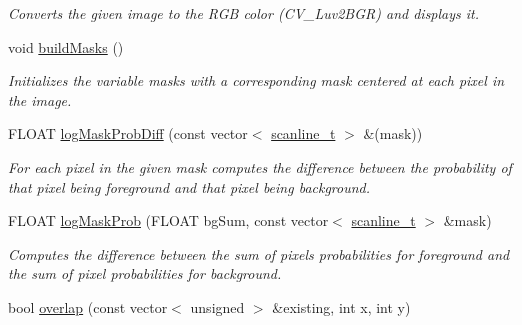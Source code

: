 \begin{DoxyCompactItemize}
\begin{DoxyCompactList}\small\item\em Converts the given image to the RGB color (CV\_\-Luv2BGR) and displays it. \item\end{DoxyCompactList}\item 
\hypertarget{classfindPersonImage_a75c79495f6bea5917afce73830352a4c}{
void \hyperlink{classfindPersonImage_a75c79495f6bea5917afce73830352a4c}{buildMasks} ()}
\label{classfindPersonImage_a75c79495f6bea5917afce73830352a4c}

\begin{DoxyCompactList}\small\item\em Initializes the variable {\ttfamily masks} with a corresponding mask centered at each pixel in the image. \item\end{DoxyCompactList}\item 
\hypertarget{classfindPersonImage_aba30f91bb709a9ed247c80f3a4c827d5}{
FLOAT \hyperlink{classfindPersonImage_aba30f91bb709a9ed247c80f3a4c827d5}{logMaskProbDiff} (const vector$<$ \hyperlink{structscanline__t}{scanline\_\-t} $>$ \&(mask))}
\label{classfindPersonImage_aba30f91bb709a9ed247c80f3a4c827d5}

\begin{DoxyCompactList}\small\item\em For each pixel in the given mask computes the difference between the probability of that pixel being foreground and that pixel being background. \item\end{DoxyCompactList}\item 
\hypertarget{classfindPersonImage_ab92a2618bc71cef02194adb24833c0b3}{
FLOAT \hyperlink{classfindPersonImage_ab92a2618bc71cef02194adb24833c0b3}{logMaskProb} (FLOAT bgSum, const vector$<$ \hyperlink{structscanline__t}{scanline\_\-t} $>$ \&mask)}
\label{classfindPersonImage_ab92a2618bc71cef02194adb24833c0b3}

\begin{DoxyCompactList}\small\item\em Computes the difference between the sum of pixels probabilities for foreground and the sum of pixel probabilities for background. \item\end{DoxyCompactList}\item 
\hypertarget{classfindPersonImage_aaf033810455a87eb5f32cfed75b5519e}{
bool \hyperlink{classfindPersonImage_aaf033810455a87eb5f32cfed75b5519e}{overlap} (const vector$<$ unsigned $>$ \&existing, int x, int y)}
\label{classfindPersonImage_aaf033810455a87eb5f32cfed75b5519e}


\end{DoxyCompactItemize}
